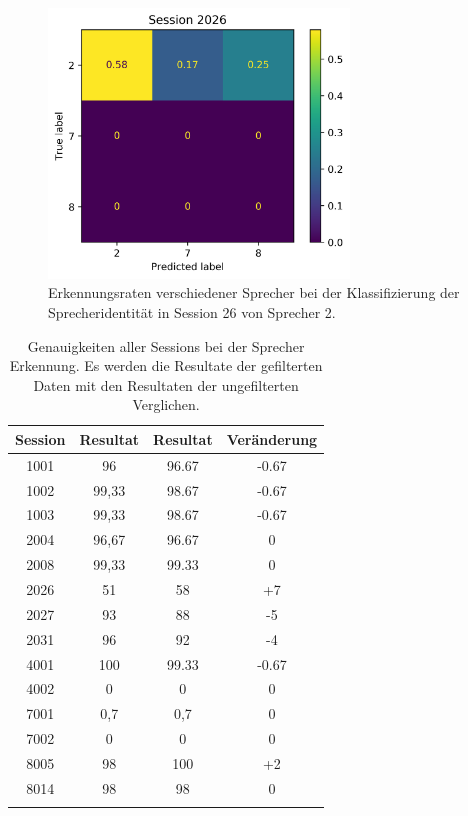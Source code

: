 \begin{figure}[H]
  \centering
  \includegraphics[width=80mm ,scale=0.6]{userCrossSessionUnf_without29/Session 2026Unf_without29.png}
  \caption{Erkennungsraten verschiedener Sprecher bei der Klassifizierung der Sprecheridentität in Session 26 von Sprecher 2.}
  \label{fig:cn4}
\end{figure}

\begin{table}[H]
 \centering
 \caption{Genauigkeiten aller Sessions bei der Sprecher Erkennung. Es werden die Resultate der gefilterten Daten mit den Resultaten der ungefilterten Verglichen.}
\begin{tabular}{|c|c|c|c|}
\hline 
Session & Resultat & Resultat & Veränderung \\ 
\hline 
1001 & 96 & 96.67 & -0.67 \\ 
\hline 
1002 & 99,33 & 98.67 & -0.67 \\ 
\hline 
1003 & 99,33 & 98.67 & -0.67 \\ 
\hline 
2004 & 96,67 & 96.67 & 0 \\  
\hline 
2008 & 99,33 & 99.33 & 0\\ 
\hline 
2026 & 51 & 58 & +7 \\ 
\hline 
2027 & 93 & 88 & -5 \\ 
\hline 
2031 & 96 & 92 & -4\\ 
\hline 
4001 & 100 & 99.33 & -0.67 \\ 
\hline 
4002 & 0 & 0 & 0 \\ 
\hline 
7001 & 0,7 & 0,7 & 0 \\ 
\hline 
7002 & 0 & 0 & 0\\ 
\hline 
8005 & 98 & 100 & +2 \\ 
\hline 
8014 & 98 & 98 & 0 \\ 
\hline
\label{tab:UnfSessionsNo29} 
\end{tabular}
\end{table}

